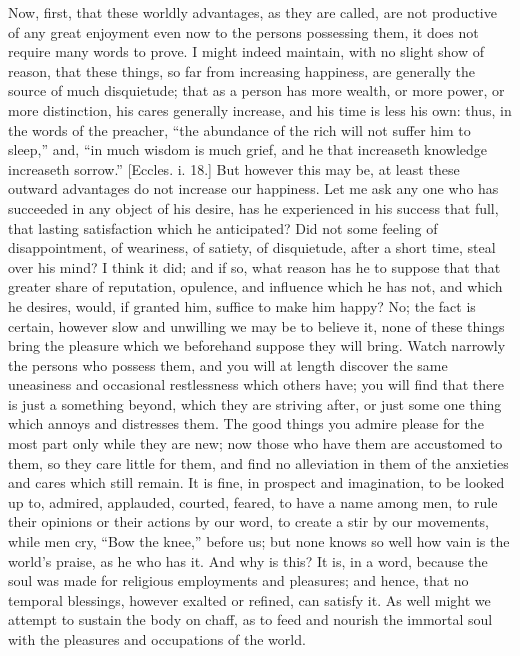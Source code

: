 Now, first, that these worldly advantages, as they are called, are
not productive of any great enjoyment even now to the persons
possessing them, it does not require many words to prove. I might
indeed maintain, with no slight show of reason, that these things, so
far from increasing happiness, are generally the source of much
disquietude; that as a person has more wealth, or more power, or more
distinction, his cares generally increase, and his time is less his
own: thus, in the words of the preacher, ``the abundance of the
rich will not suffer him to sleep,'' and, ``in much wisdom is
much grief, and he that increaseth knowledge increaseth sorrow.''
[Eccles. i. 18.] But however this may be, at least these outward
advantages do not increase our happiness. Let me ask any one who has
succeeded in any object of his desire, has he experienced in his
success that full, that lasting satisfaction which he anticipated? Did
not some feeling of disappointment, of weariness, of satiety, of
disquietude, after a short time, steal over his mind? I think it did;
and if so, what reason has he to suppose that that greater share of
reputation, opulence, and influence which he has not, and which he
desires, would, if granted him, suffice to make him happy? No; the
fact is certain, however slow and unwilling we may be to believe it,
none of these things bring the pleasure which we beforehand suppose
they will bring. Watch narrowly the persons who possess them, and you
will at length discover the same uneasiness and occasional
restlessness which others have; you will find that there is just a
something beyond, which they are striving after, or just some one
thing which annoys and distresses them. The good things you admire
please for the most part only while they are new; now those who have
them are accustomed to them, so they care little for them, and find no
alleviation in them of the anxieties and cares which still remain. It
is fine, in prospect and imagination, to be looked up to, admired,
applauded, courted, feared, to have a name among men, to rule their
opinions or their actions by our word, to create a stir by our
movements, while men cry, ``Bow the knee,'' before us; but
none knows so well how vain is the world's praise, as he who has it.
And why is this? It is, in a word, because the soul was made for
religious employments and pleasures; and hence, that no temporal
blessings, however exalted or refined, can satisfy it. As well might
we attempt to sustain the body on chaff, as to feed and nourish the
immortal soul with the pleasures and occupations of the world.

